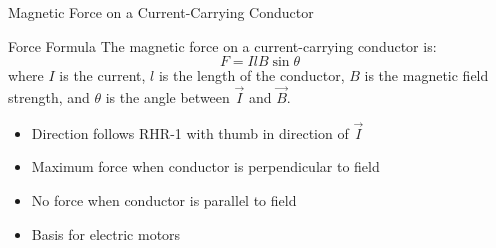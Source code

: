 \documentclass{beamer}
\begin{document}
\begin{frame}{Magnetic Force on a Current-Carrying Conductor}
\begin{block}{Force Formula}
The magnetic force on a current-carrying conductor is:
\begin{equation}
F = IlB\sin\theta
\end{equation}
where $I$ is the current, $l$ is the length of the conductor, $B$ is the magnetic field strength, and $\theta$ is the angle between $\vec{I}$ and $\vec{B}$.
\end{block}


\begin{itemize}
\item Direction follows RHR-1 with thumb in direction of $\vec{I}$
\item Maximum force when conductor is perpendicular to field
\item No force when conductor is parallel to field
\item Basis for electric motors
\end{itemize}


\end{frame}
\end{document}
